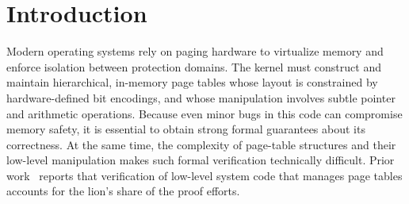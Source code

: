 \section{Introduction}



Modern operating systems rely on paging hardware to virtualize memory and enforce isolation between protection domains. The kernel must construct and maintain hierarchical, in-memory page tables whose layout is constrained by hardware-defined bit encodings, and whose manipulation involves subtle pointer and arithmetic operations. Because even minor bugs in this code can compromise memory safety, it is essential to obtain strong formal guarantees about its correctness. At the same time, the complexity of page-table structures and their low-level manipulation makes such formal verification technically difficult. Prior work~\cite{brun23hotos} reports that verification of low-level system code that manages page tables accounts for the lion's share of the proof efforts.

